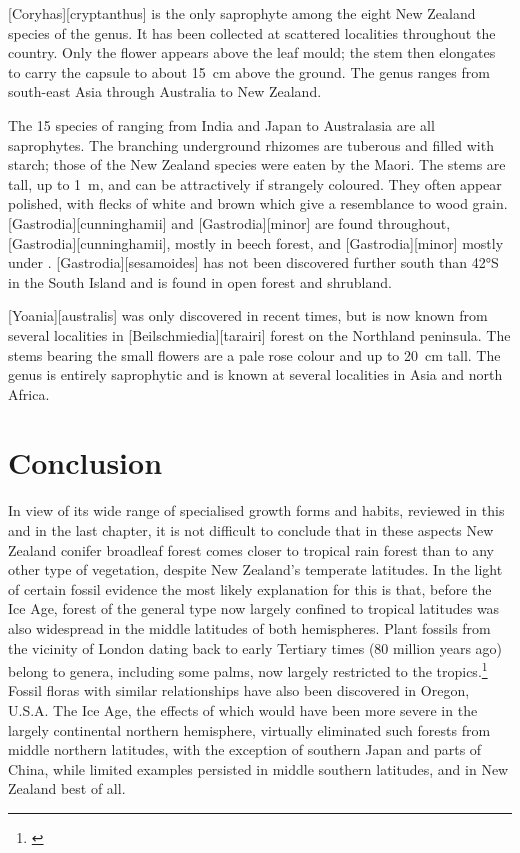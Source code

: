 [Coryhas][cryptanthus] is the only saprophyte among the eight New Zealand species of the genus.
It has been collected at scattered localities throughout the country.
Only the flower appears above the leaf mould; the stem then elongates to carry the capsule to about \SI{15}{\centi\metre} above the ground.
The genus ranges from south-east Asia through Australia to New Zealand.

The 15 species of  ranging from India and Japan to Australasia are all saprophytes.
The branching underground rhizomes are tuberous and filled with starch; those of the New Zealand species were eaten by the Maori.
The stems are tall, up to \SI{1}{\metre}, and can be attractively if strangely coloured.
They often appear polished, with flecks of white and brown which give a resemblance to wood grain. [Gastrodia][cunninghamii] and [Gastrodia][minor] are found throughout, [Gastrodia][cunninghamii], mostly in beech forest, and [Gastrodia][minor] mostly under . [Gastrodia][sesamoides] has not been discovered further south than \ang{42}S in the South Island and is found in open forest and shrubland.

[Yoania][australis] was only discovered in recent times, but is now known from several localities in [Beilschmiedia][tarairi] forest on the Northland peninsula.
The stems bearing the small flowers are a pale rose colour and up to \SI{20}{\centi\metre} tall.
The genus is entirely saprophytic and is known at several localities in Asia and north Africa.

\section{Conclusion}

In view of its wide range of specialised growth forms and habits, reviewed in this and in the last chapter, it is not difficult to conclude that in these aspects New Zealand conifer broadleaf forest comes closer to tropical rain forest than to any other type of vegetation, despite New Zealand's temperate latitudes.
In the light of certain fossil evidence the most likely explanation for this is that, before the Ice Age, forest of the general type now largely confined to tropical latitudes was also widespread in the middle latitudes of both hemispheres.
Plant fossils from the vicinity of London dating back to early Tertiary times (80 million years ago) belong to genera, including some palms, now largely restricted to the tropics.\footnote{\cite{chandler1964lower}}
Fossil floras with similar relationships have also been discovered in Oregon, U.S.A.
The Ice Age, the effects of which would have been more severe in the largely continental northern hemisphere, virtually eliminated such forests from middle northern latitudes, with the exception of southern Japan and parts of China, while limited examples persisted in middle southern latitudes, and in New Zealand best of all.


